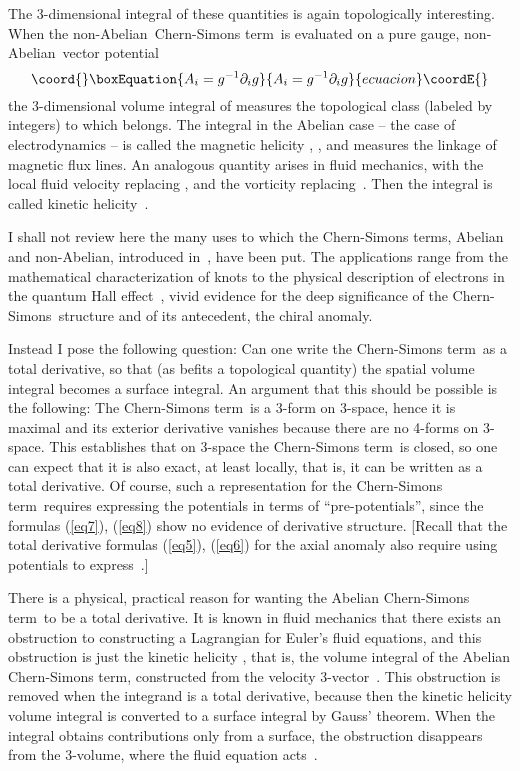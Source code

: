 \documentclass[a4paper,12pt,twoside]{article}
\providecommand{\rd}[1]{\mathop{\mathrm{d}#1}}
\providecommand{\grad}{\vec\nabla}
\providecommand{\nA}{non-Abelian}
\providecommand{\CS}{Chern-Simons}
\providecommand{\CSt}{Chern-Simons term}
\providecommand{\pp}[1]{\partial_{#1}}
\providecommand{\numeq}[2]{\begin{equation}\coord{}\boxEquation{
#2
\label{#1}
}{
#2
}{ecuacion}\coordE{}\end{equation}}
\providecommand{\refeq}[1]{(\ref{#1})}
\let\vec\boldsymbol
\begin{document}
The 3-dimensional integral of these quantities is again topologically interesting. When
the
\nA\
\CSt\ is evaluated on a pure gauge, \nA\ vector potential
\numeq{eq9}{
A_i = g^{-1} \pp i g
} 
the 3-dimensional volume integral of \coordHE{} measures the
topological class (labeled by integers) to which \myHighlight{$g$}\coordHE{} belongs. The integral in the
Abelian case -- the case of electrodynamics -- is called the magnetic helicity \myHighlight{$\int
\rd{^3 r} \vec A\cdot
\vec B$}\coordHE{},
\myHighlight{$\vec B = \grad
\times \vec A$}\coordHE{}, and measures the linkage of magnetic flux lines. An analogous
quantity arises in fluid mechanics, with the local fluid velocity \myHighlight{$\vec v$}\coordHE{} replacing
\myHighlight{$\vec A$}\coordHE{}, and the vorticity \myHighlight{$\vec\omega = \grad\times\vec v$}\coordHE{} replacing~\myHighlight{$\vec B$}\coordHE{}. Then
the integral \myHighlight{$\int \rd{^3 r} \vec v\cdot \vec\omega$}\coordHE{} is called kinetic
helicity~\cite{ref8}.

I shall not review here the many uses to which the \CSt s, Abelian and \nA,
introduced in~\cite{ref7}, have been put. The applications range from the
mathematical characterization of knots to the physical description of electrons in the
quantum Hall effect~\cite{ref9},  vivid evidence for the deep significance of the \CS\
structure and of its antecedent, the chiral anomaly.

Instead I pose the following question: Can one write the \CSt\ as a total derivative, so
that (as befits a topological quantity) the spatial volume integral becomes a surface
integral. An argument that this should be possible is the following: The
\CSt\ is a 3-form on 3-space, hence it is maximal and its exterior derivative vanishes
because there are no 4-forms on 3-space. This establishes that on 3-space  the \CSt\
is closed, so one can expect that it is also exact, at least locally, that is, it can be
written as a total derivative. 
Of course, such a representation for the \CSt\ requires expressing the
potentials in terms of ``pre-potentials'', since the 
 formulas
\refeq{eq7}, \refeq{eq8} show no evidence of derivative structure.
[Recall that the total derivative formulas \refeq{eq5}, \refeq{eq6} for the axial
anomaly also require using potentials to express~\coordHE{}.]

There is a physical, practical reason for wanting the Abelian \CSt\  to be a total
derivative. It is known in fluid mechanics that there exists an obstruction to
constructing a Lagrangian for Euler's fluid equations, and this obstruction is just the
kinetic helicity  \hbox{\myHighlight{$\int \rd{^3 r} \vec v\cdot \vec\omega$}\coordHE{}}, that is, the volume
integral of the Abelian \CSt, constructed from the velocity 3-vector~\myHighlight{$\vec v$}\coordHE{}. This
obstruction is removed when the integrand is a total derivative, because then the
kinetic helicity volume integral is converted to a surface integral by Gauss' theorem.
When the integral obtains contributions only from a surface,  the obstruction
disappears from the 3-volume, where the fluid equation acts~\cite{ref10}. 
\end{document}
